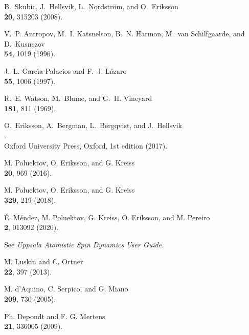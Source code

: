 \documentclass[11pt,fleqn,a4]{book} %
\begin{document}
\begin{thebibliography}{1}

B.~Skubic, J.~Hellsvik, L.~Nordstr{\"o}m, and O.~Eriksson\\
  \textbf{20}, 315203 (2008).

V.~P. Antropov, M.~I. Katsnelson, B.~N. Harmon, M.~van Schilfgaarde, and
  D.~Kusnezov \\
 \textbf{54}, 1019 (1996).

J.~L. Garc\'\i{}a-Palacios and F.~J. L\'azaro\\
 \textbf{ 55}, 1006 (1997).

R.~E. Watson, M.~Blume, and G.~H. Vineyard\\
 \textbf{ 181}, 811 (1969).

O.~Eriksson, A.~Bergman, L.~Bergqvist, and J.~Hellsvik\\
.\\
\newblock Oxford University Press, Oxford, 1st edition (2017).

  M. Poluektov, O. Eriksson, and G. Kreiss\\
    \textbf{20}, 969 (2016).
   
  M. Poluektov, O. Eriksson, and G. Kreiss\\
   \textbf{329}, 219 (2018).
  
   \'E. M\'endez, M. Poluektov, G. Kreiss, O. Eriksson, and M. Pereiro\\
    \textbf{2}, 013092 (2020).
   
  See {\it Uppsala Atomistic Spin Dynamics User Guide.}

   
  M. Luskin and C. Ortner\\
    \textbf{22}, 397 (2013).
  
  M. d'Aquino, C. Serpico, and G. Miano\\
    \textbf{209}, 730 (2005). 
   
  Ph. Depondt and F. G. Mertens\\
    \textbf{21}, 336005 (2009). 

\end{thebibliography}
\end{document}
